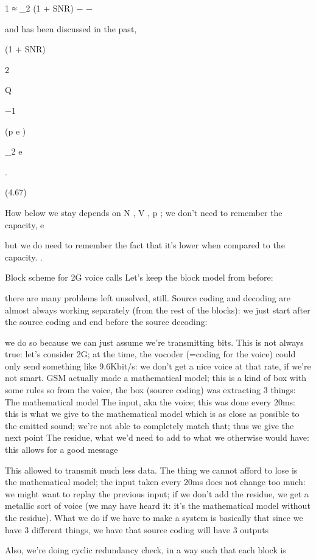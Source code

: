 {{{{{1
≈ \log_2 (1 + SNR) −  −

and has been discussed in the past,

(1 + SNR)

2

Q

−1

(p e )

\log_2 e
\sqrtN

.

(4.67)

How below we stay depends on N , V , p ; we don't need to remember the capacity,
e

but we do need to remember the fact that it's lower when compared to the capacity.
.

Block scheme for 2G voice calls Let's keep the block model from before:

there are many problems left unsolved, still.
Source coding and decoding are almost always working separately (from the rest of the blocks): we just start after the source coding and end before the source decoding:

we do so because we can just assume we're transmitting bits.
This is not always true: let's consider 2G; at the time, the vocoder (=coding for the voice) could only send something like 9.6Kbit/s: we don't get a nice voice at that rate, if we're not smart. GSM actually made a mathematical model; this is a kind of box with some rules so from the voice, the box (source coding) was extracting 3 things:
The mathematical model The input, aka the voice; this was done every 20ms: this is what we give to the mathematical model which is as close as possible to the emitted sound; we're not able to completely match that; thus we give the next point The residue, what we'd need to add to what we otherwise would have: this allows for a good message

This allowed to transmit much less data. The thing we cannot afford to lose is the mathematical model; the input taken every 20ms does not change too much: we might want to replay the previous input; if we don't add the residue, we get a metallic sort of voice (we may have heard it: it's the mathematical model without the residue).
What we do if we have to make a system is basically that since we have 3 different things, we have that source coding will have 3 outputs

Also, we're doing cyclic redundancy check, in a way such that each block is

}}}}}
